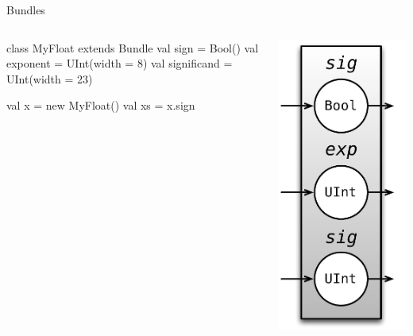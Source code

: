 \documentclass[xcolor=pdflatex,dvipsnames,table]{beamer}
\begin{document}
\begin{frame}[fragile]{Bundles}

\begin{columns}
\begin{scala}
class MyFloat extends Bundle {
  val sign        = Bool()
  val exponent    = UInt(width = 8)
  val significand = UInt(width = 23)
}

val x  = new MyFloat()
val xs = x.sign
\end{scala}


\begin{center}
\includegraphics[height=0.9\textheight]{../cs250/figs/myfloat.pdf} 
\end{center}

\end{columns}
\end{frame}
\end{document}
